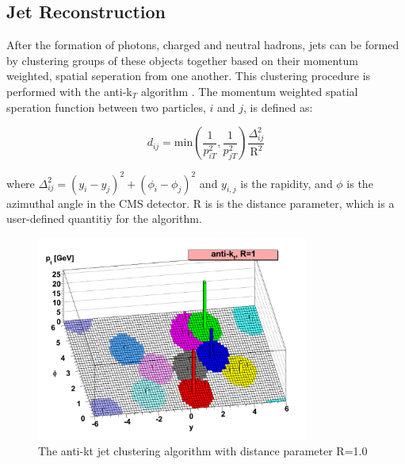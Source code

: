 \subsection{Jet Reconstruction}
\label{jet_reco_overview}

\par After the formation of photons, charged and neutral hadrons, jets
can be formed by clustering groups of these objects together based on
their momentum weighted, spatial seperation from one another.  This
clustering procedure is performed with the anti-k$_{T}$ algorithm
\cite{Cacciari:2008gp}.   The momentum weighted spatial speration
function between two particles, $i$ and $j$, is defined as:

\begin{equation}\label{eq:antiKt_d}
d_{ij} = \text{min}(\frac{1}{p_{iT}^{2}},
\frac{1}{p_{jT}^{2}})\frac{\Delta_{ij}^{2}}{\text{R}^{2}}
\end{equation}

\noindent where $\Delta_{ij}^{2} =
(y_{i}-y_{j})^{2}+(\phi_{i}-\phi_{j})^{2}$ and $y_{i,j}$ is the
rapidity, and $\phi$ is the azimuthal angle in the CMS detector.  R is
is the distance parameter, which is a user-defined quantitiy for the
algorithm.  

\begin{figure}[h]
   \centering
  \includegraphics[width=0.8\textwidth]{Figures/Reconstruction_Diagrams/Jets__AntiKt_Algo.pdf}
  \caption{The anti-kt jet clustering algorithm with distance
    parameter R=1.0} \label{fig:antiKt}
\end{figure}


